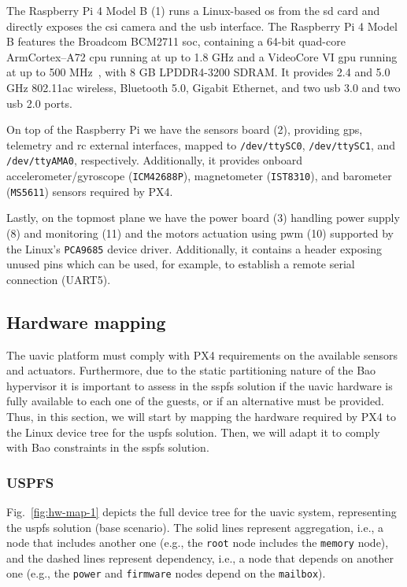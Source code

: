 The Raspberry Pi 4 Model B (1) runs a Linux-based \gls{os}
from the \gls{sd} card and directly exposes the \gls{csi} camera and the
\gls{usb} interface. The Raspberry Pi 4 Model B features the Broadcom BCM2711
\gls{soc}, containing a 64-bit quad-core Arm\textreg Cortex\textreg--A72 \gls{cpu} running
at up to 1.8 GHz and a VideoCore VI \gls{gpu} running at up to 500
MHz~\cite{rpi4-specs,rpi4-bcm2711}, with 8 GB LPDDR4-3200 SDRAM. It provides 2.4
and 5.0 GHz 802.11ac wireless, Bluetooth 5.0, Gigabit Ethernet, and two
\gls{usb} 3.0 and two \gls{usb} 2.0 ports.

On top of the Raspberry Pi we have the sensors board (2),
providing \gls{gps}, telemetry and \gls{rc} external interfaces, mapped to
\texttt{/dev/ttySC0}, \texttt{/dev/ttySC1}, and \texttt{/dev/ttyAMA0},
respectively. Additionally, it provides onboard accelerometer/gyroscope
(\texttt{ICM42688P}), magnetometer (\texttt{IST8310}), and barometer
(\texttt{MS5611}) sensors required by PX4.

Lastly, on the topmost
plane we have the power board (3) handling power supply (8) and monitoring (11)
and the motors actuation using \gls{pwm} (10) supported by the Linux's \texttt{PCA9685}
device driver. Additionally, it contains a
header exposing unused pins which can be used, for example, to establish a
remote serial connection (UART5).

\subsection{Hardware mapping}
\label{sec:hardware-mapping}
The \gls{uavic} platform must comply with PX4 requirements on the available
sensors and actuators. Furthermore, due to the static partitioning nature of the
Bao hypervisor it is important to assess in the \gls{sspfs} solution if the \gls{uavic} hardware is fully
available to each one of the guests, or if an alternative must be
provided. Thus, in this section, we will start by mapping the hardware required
by PX4 to the Linux device tree for the \gls{uspfs} solution. Then, we will
adapt it to comply with Bao constraints in the \gls{sspfs} solution.


\subsubsection{USPFS}
\label{sec:base-scenario}
Fig.~\ref{fig:hw-map-1} depicts the full device tree for the \gls{uavic} system,
representing the \gls{uspfs} solution (base scenario).
The solid lines represent aggregation, i.e., a node that includes another one
(e.g., the \texttt{root} node includes the \texttt{memory} node), and the
dashed lines represent dependency, i.e., a node that depends on another one
(e.g., the \texttt{power} and \texttt{firmware} nodes depend on the
\texttt{mailbox}).

